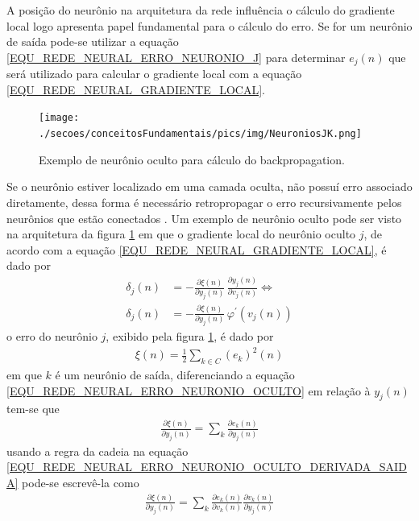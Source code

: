 A posição do neurônio na arquitetura da rede influência o cálculo do gradiente local logo apresenta papel fundamental para o cálculo do erro. Se for um neurônio de saída pode-se utilizar a equação \eqref{EQU_REDE_NEURAL_ERRO_NEURONIO_J} para determinar \(e_{j}(n)\) que será utilizado para calcular o gradiente local com a equação \eqref{EQU_REDE_NEURAL_GRADIENTE_LOCAL}.
\begin{figure}[hbt]
	\centering
 	  \caption{Exemplo de neurônio oculto para cálculo do backpropagation.}
		\texttt{[image: ./secoes/conceitosFundamentais/pics/img/NeuroniosJK.png]}
	\label{FIGURA_REDE_NEURAL_NEURONIOS_BACKPROPAGATION}
\end{figure}
Se o neurônio estiver localizado em uma camada oculta, não possuí erro associado diretamente, dessa forma é necessário retropropagar o erro recursivamente pelos neurônios que estão conectados \cite{Haykin2007}. Um exemplo de neurônio oculto pode ser visto na arquitetura da figura \ref{FIGURA_REDE_NEURAL_NEURONIOS_BACKPROPAGATION} em que o gradiente local do neurônio oculto \(j\), de acordo com a equação \eqref{EQU_REDE_NEURAL_GRADIENTE_LOCAL}, é dado por
\begin{align}
\delta_{j}(n) &= - \frac{\partial \xi(n)}{\partial y_{j}(n)} \, \frac{\partial y_{j}(n)}{\partial v_{j}(n)} \Leftrightarrow \label{EQU_REDE_NEURAL_GRADIENTE_LOCAL_CASO2}\\
\delta_{j}(n) &= - \frac{\partial \xi(n)}{\partial y_{j}(n)} \, \varphi^{'}(v_{j}(n))
\end{align}
o erro do neurônio \(j\), exibido pela figura \ref{FIGURA_REDE_NEURAL_NEURONIOS_BACKPROPAGATION}, é dado por
\begin{align}
\xi(n) = \frac{1}{2} \sum\limits_{k \in C}(e_{k})^{2}(n) \label{EQU_REDE_NEURAL_ERRO_NEURONIO_OCULTO}
\end{align}
em que \(k\) é um neurônio de saída, diferenciando a equação \eqref{EQU_REDE_NEURAL_ERRO_NEURONIO_OCULTO} em relação à \(y_{j}(n)\) tem-se que
\begin{align}
\frac{\partial \xi(n)}{\partial y_{j}(n)} = \sum\limits_{k} \frac{\partial e_{k}(n)}{\partial y_{j}(n)}  \label{EQU_REDE_NEURAL_ERRO_NEURONIO_OCULTO_DERIVADA_SAIDA}
\end{align}
usando a regra da cadeia na equação \eqref{EQU_REDE_NEURAL_ERRO_NEURONIO_OCULTO_DERIVADA_SAIDA} pode-se escrevê-la como
\begin{align}
\frac{\partial \xi(n)}{\partial y_{j}(n)} = \sum\limits_{k} \frac{\partial e_{k}(n)}{\partial v_{k}(n)} \frac{\partial v_{k}(n)}{\partial y_{j}(n)} \label{EQU_REDE_NEURAL_ERRO_NEURONIO_OCULTO_DERIVADA_SAIDA_REGRA_CADEIA}
\end{align}
